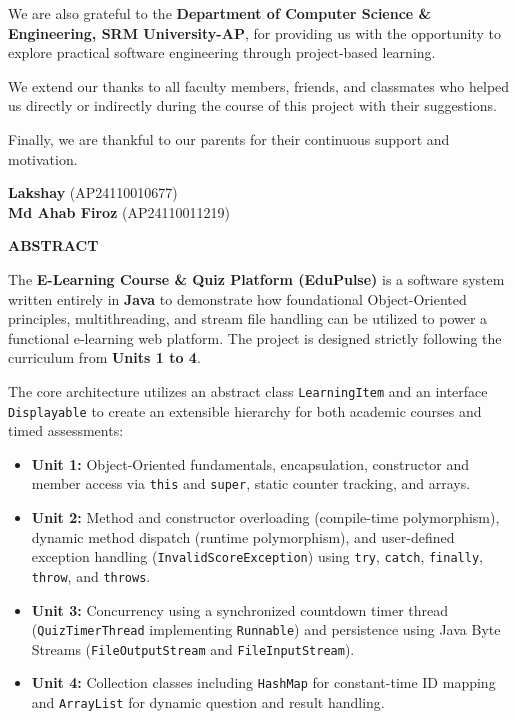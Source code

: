 \documentclass[12pt,a4paper]{article}
\begin{document}
\vspace{0.8cm}
\noindent We are also grateful to the \textbf{Department of Computer Science \& Engineering, SRM University-AP}, for providing us with the opportunity to explore practical software engineering through project-based learning.

\vspace{0.8cm}
\noindent We extend our thanks to all faculty members, friends, and classmates who helped us directly or indirectly during the course of this project with their suggestions.

\vspace{0.8cm}
\noindent Finally, we are thankful to our parents for their continuous support and motivation.

\vspace{2.5cm}
\noindent \textbf{Lakshay} (AP24110010677)\\
\textbf{Md Ahab Firoz} (AP24110011219)

\newpage

\begin{center}
    {\huge \textbf{ABSTRACT}}\\[1.5cm]
\end{center}

\noindent The \textbf{E-Learning Course \& Quiz Platform (EduPulse)} is a software system written entirely in \textbf{Java} to demonstrate how foundational Object-Oriented principles, multithreading, and stream file handling can be utilized to power a functional e-learning web platform. The project is designed strictly following the curriculum from \textbf{Units 1 to 4}.

\vspace{0.5cm}
\noindent The core architecture utilizes an abstract class \texttt{LearningItem} and an interface \texttt{Displayable} to create an extensible hierarchy for both academic courses and timed assessments:
\begin{itemize}
    \item \textbf{Unit 1:} Object-Oriented fundamentals, encapsulation, constructor and member access via \texttt{this} and \texttt{super}, static counter tracking, and arrays.
    \item \textbf{Unit 2:} Method and constructor overloading (compile-time polymorphism), dynamic method dispatch (runtime polymorphism), and user-defined exception handling (\texttt{InvalidScoreException}) using \texttt{try}, \texttt{catch}, \texttt{finally}, \texttt{throw}, and \texttt{throws}.
    \item \textbf{Unit 3:} Concurrency using a synchronized countdown timer thread (\texttt{QuizTimerThread} implementing \texttt{Runnable}) and persistence using Java Byte Streams (\texttt{FileOutputStream} and \texttt{FileInputStream}).
    \item \textbf{Unit 4:} Collection classes including \texttt{HashMap} for constant-time ID mapping and \texttt{ArrayList} for dynamic question and result handling.
\end{itemize}
\end{document}
